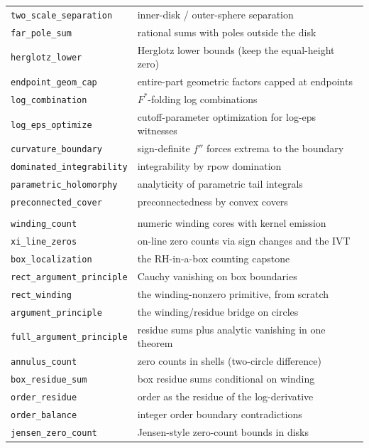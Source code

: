 {\begin{longtable}{@{}p{}p{}@{}}
\texttt{two\_scale\_separation} & inner-disk / outer-sphere separation \\
\texttt{far\_pole\_sum} & rational sums with poles outside the disk \\
\texttt{herglotz\_lower} & Herglotz lower bounds (keep the equal-height zero) \\
\texttt{endpoint\_geom\_cap} & entire-part geometric factors capped at endpoints \\
\texttt{log\_combination} & $F^*$-folding log combinations \\
\texttt{log\_eps\_optimize} & cutoff-parameter optimization for log-eps witnesses \\
\texttt{curvature\_boundary} & sign-definite $f''$ forces extrema to the boundary \\
\texttt{dominated\_integrability} & integrability by rpow domination \\
\texttt{parametric\_holomorphy} & analyticity of parametric tail integrals \\
\texttt{preconnected\_cover} & preconnectedness by convex covers \\
\addlinespace
\multicolumn{2}{@{}l}{\emph{Argument principle and zero localization}} \\
\texttt{winding\_count} & numeric winding cores with kernel emission \\
\texttt{xi\_line\_zeros} & on-line zero counts via sign changes and the IVT \\
\texttt{box\_localization} & the RH-in-a-box counting capstone \\
\texttt{rect\_argument\_principle} & Cauchy vanishing on box boundaries \\
\texttt{rect\_winding} & the winding-nonzero primitive, from scratch \\
\texttt{argument\_principle} & the winding/residue bridge on circles \\
\texttt{full\_argument\_principle} & residue sums plus analytic vanishing in one theorem \\
\texttt{annulus\_count} & zero counts in shells (two-circle difference) \\
\texttt{box\_residue\_sum} & box residue sums conditional on winding \\
\texttt{order\_residue} & order as the residue of the log-derivative \\
\texttt{order\_balance} & integer order boundary contradictions \\
\texttt{jensen\_zero\_count} & Jensen-style zero-count bounds in disks \\

\end{longtable}}
